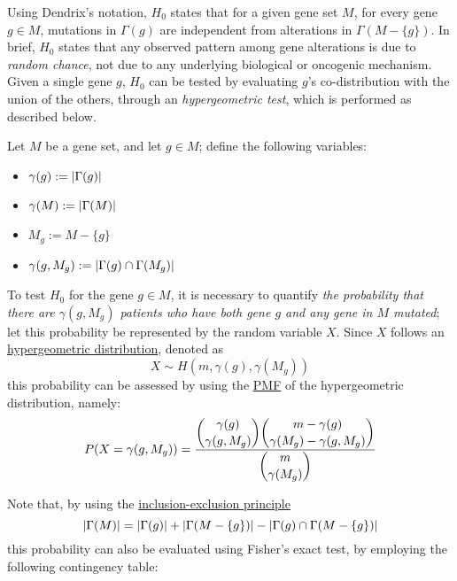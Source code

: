 Using Dendrix's notation, $H_0$ states that for a given gene set $M$, for every gene $g \in M$, mutations in $\Gamma(g)$ are independent from alterations in $\Gamma(M - \{g\})$. In brief, $H_0$ states that any observed pattern among gene alterations is due to \textit{random chance}, not due to any underlying biological or oncogenic mechanism. Given a single gene $g$, $H_0$ can be tested by evaluating $g$'s co-distribution with the union of the others, through an \textit{hypergeometric test}, which is performed as described below.

\begin{definition}[Notation]
    Let $M$ be a gene set, and let $g \in M$; define the following variables:

    \begin{itemize}
        \item $\gamma(g) := \left|\Gamma(g)\right|$
        \item $\gamma(M) := \left|\Gamma(M)\right|$
        \item $M_g := M - \{g\}$
        \item $\gamma(g, M_g) := \left|\Gamma(g) \cap \Gamma(M_g)\right|$
    \end{itemize}
\end{definition}

To test $H_0$ for the gene $g \in M$, it is necessary to quantify \textit{the probability that there are $\gamma(g, M_g)$ patients who have both gene $g$ and any gene in $M$ mutated}; let this probability be represented by the random variable $X$. Since $X$ follows an \href{https://en.wikipedia.org/wiki/Hypergeometric_distribution}{hypergeometric distribution}, denoted as $$X \sim H(m, \gamma(g), \gamma(M_g))$$ this probability can be assessed by using the \href{https://en.wikipedia.org/wiki/Probability_mass_function}{PMF} of the hypergeometric distribution, namely: $$P(X = \gamma(g, M_g)) = \dfrac{\dbinom{\gamma(g)}{\gamma(g, M_g)}\dbinom{m - \gamma(g)}{\gamma(M_g) - \gamma(g, M_g)}}{\dbinom{m}{\gamma(M_g)}}$$

Note that, by using the \href{https://en.wikipedia.org/wiki/Inclusion%E2%80%93exclusion_principle}{inclusion-exclusion principle} $$\left|\Gamma(M)\right| = \left|\Gamma(g)\right| + \left|\Gamma(M - \{g\})\right| - \left|\Gamma(g) \cap \Gamma(M - \{g\})\right|$$ this probability can also be evaluated using Fisher's exact test, by employing the following contingency table:

